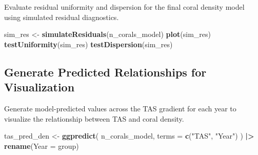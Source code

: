 \documentclass[
]{article}
\newenvironment{Shaded}{\begin{snugshade}}{\end{snugshade}}
\newcommand{\AttributeTok}[1]{\textcolor[rgb]{0.13,0.29,0.53}{#1}}
\newcommand{\FunctionTok}[1]{\textcolor[rgb]{0.13,0.29,0.53}{\textbf{#1}}}
\newcommand{\NormalTok}[1]{#1}
\newcommand{\OtherTok}[1]{\textcolor[rgb]{0.56,0.35,0.01}{#1}}
\newcommand{\SpecialCharTok}[1]{\textcolor[rgb]{0.81,0.36,0.00}{\textbf{#1}}}
\newcommand{\StringTok}[1]{\textcolor[rgb]{0.31,0.60,0.02}{#1}}
\begin{document}
Evaluate residual uniformity and dispersion for the final coral density
model using simulated residual diagnostics.

\begin{Shaded}
\begin{Highlighting}[]
\NormalTok{sim\_res }\OtherTok{\textless{}{-}} \FunctionTok{simulateResiduals}\NormalTok{(n\_corals\_model)}
\FunctionTok{plot}\NormalTok{(sim\_res)}
\FunctionTok{testUniformity}\NormalTok{(sim\_res)}
\FunctionTok{testDispersion}\NormalTok{(sim\_res)}
\end{Highlighting}
\end{Shaded}

\subsection{Generate Predicted Relationships for
Visualization}\label{generate-predicted-relationships-for-visualization-1}

Generate model-predicted values across the TAS gradient for each year to
visualize the relationship between TAS and coral density.

\begin{Shaded}
\begin{Highlighting}[]
\NormalTok{tas\_pred\_den }\OtherTok{\textless{}{-}} \FunctionTok{ggpredict}\NormalTok{(}
\NormalTok{  n\_corals\_model,}
  \AttributeTok{terms =} \FunctionTok{c}\NormalTok{(}\StringTok{"TAS"}\NormalTok{, }\StringTok{"Year"}\NormalTok{)}
\NormalTok{) }\SpecialCharTok{|\textgreater{}}
  \FunctionTok{rename}\NormalTok{(}\AttributeTok{Year =}\NormalTok{ group)}
\end{Highlighting}
\end{Shaded}
\end{document}
